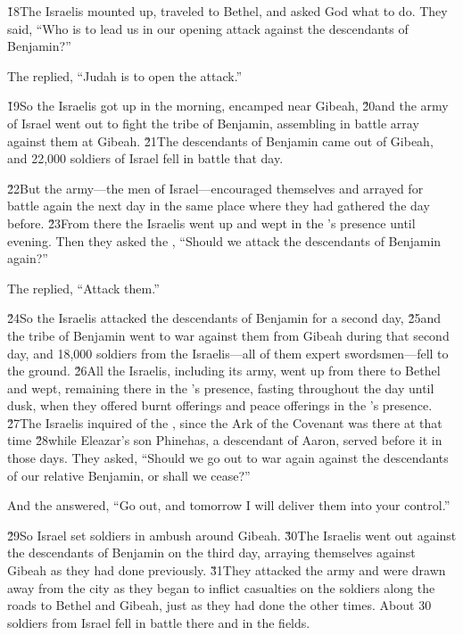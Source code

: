 \v{18}The Israelis mounted up, traveled to Bethel, and asked God what to do. They said, ``Who is to lead us in our opening attack against the descendants of Benjamin?''

The  replied, ``Judah is to open the attack.''

\v{19}So the Israelis got up in the morning, encamped near Gibeah, \v{20}and the army of Israel went out to fight the tribe of Benjamin, assembling in battle array against them at Gibeah. \v{21}The descendants of Benjamin came out of Gibeah, and 22,000 soldiers of Israel fell in battle that day.

\v{22}But the army---the men of Israel---encouraged themselves and arrayed for battle again the next day in the same place where they had gathered the day before. \v{23}From there the Israelis went up and wept in the 's presence until evening. Then they asked the , ``Should we attack the descendants of Benjamin again?''

The  replied, ``Attack them.''

\v{24}So the Israelis attacked the descendants of Benjamin for a second day, \v{25}and the tribe of Benjamin went to war against them from Gibeah during that second day, and 18,000 soldiers from the Israelis---all of them expert swordsmen---fell to the ground. \v{26}All the Israelis, including its army, went up from there to Bethel and wept, remaining there in the 's presence, fasting throughout the day until dusk, when they offered burnt offerings and peace offerings in the 's presence. \v{27}The Israelis inquired of the , since the Ark of the Covenant was there at that time \v{28}while Eleazar's son Phinehas, a descendant of Aaron, served before it in those days. They asked, ``Should we go out to war again against the descendants of our relative Benjamin, or shall we cease?''

And the  answered, ``Go out, and tomorrow I will deliver them into your control.''

\v{29}So Israel set soldiers in ambush around Gibeah. \v{30}The Israelis went out against the descendants of Benjamin on the third day, arraying themselves against Gibeah as they had done previously. \v{31}They attacked the army and were drawn away from the city as they began to inflict casualties on the soldiers along the roads to Bethel and Gibeah, just as they had done the other times. About 30 soldiers from Israel fell in battle there and in the fields.

